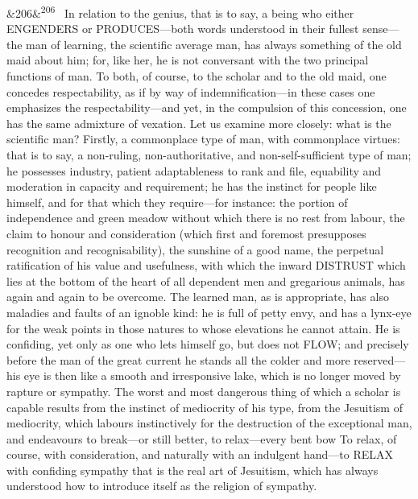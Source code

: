 \documentclass[12pt]{article}
\newcommand{\para}[1][]{\par\noindent\ifx&#1&\else\textsuperscript{\footnotesize #1}~\fi}
\begin{document}
\para[206] In relation to the genius, that is to say, a being who either ENGENDERS or PRODUCES---both words understood in their fullest sense---the man of learning, the scientific average man, has always something of the old maid about him; for, like her, he is not conversant with the two principal functions of man. To both, of course, to the scholar and to the old maid, one concedes respectability, as if by way of indemnification---in these cases one emphasizes the respectability---and yet, in the compulsion of this concession, one has the same admixture of vexation. Let us examine more closely: what is the scientific man? Firstly, a commonplace type of man, with commonplace virtues: that is to say, a non-ruling, non-authoritative, and non-self-sufficient type of man; he possesses industry, patient adaptableness to rank and file, equability and moderation in capacity and requirement; he has the instinct for people like himself, and for that which they require---for instance: the portion of independence and green meadow without which there is no rest from labour, the claim to honour and consideration (which first and foremost presupposes recognition and recognisability), the sunshine of a good name, the perpetual ratification of his value and usefulness, with which the inward DISTRUST which lies at the bottom of the heart of all dependent men and gregarious animals, has again and again to be overcome. The learned man, as is appropriate, has also maladies and faults of an ignoble kind: he is full of petty envy, and has a lynx-eye for the weak points in those natures to whose elevations he cannot attain. He is confiding, yet only as one who lets himself go, but does not FLOW; and precisely before the man of the great current he stands all the colder and more reserved---his eye is then like a smooth and irresponsive lake, which is no longer moved by rapture or sympathy. The worst and most dangerous thing of which a scholar is capable results from the instinct of mediocrity of his type, from the Jesuitism of mediocrity, which labours instinctively for the destruction of the exceptional man, and endeavours to break---or still better, to relax---every bent bow To relax, of course, with consideration, and naturally with an indulgent hand---to RELAX with confiding sympathy that is the real art of Jesuitism, which has always understood how to introduce itself as the religion of sympathy.
\end{document}
